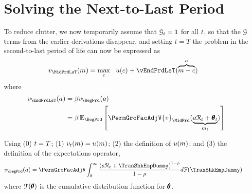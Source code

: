 
\hypertarget{solving-the-next-to-last-period}{}
\hypertarget{solving-the-next}{}
\section{Solving the Next-to-Last Period}\label{sec:solving-the-next}

To reduce clutter, we now temporarily assume that $\mathcal{G}_{t}=1$ for all $t$, so that the $\mathcal{G}$ terms from the earlier derivations disappear, and setting $t=T$ the problem in the second-to-last period of life can now be expressed as
\begin{equation}\begin{gathered}\begin{aligned}
  {\vFunc}_{\MidPrdLsT}(\mNrm)  & = \max_{\cNrm} ~~ \uFunc(\cNrm) +
                              \vEndPrdLsT(\overbrace{\mNrm-\cNrm}^{\aNrm})
                              \label{eq:vEndTm1}
\end{aligned}\end{gathered}\end{equation}
where 
\begin{equation*}\begin{gathered}\begin{aligned}
  {\vFunc}_{\EndPrdLsT}(\aNrm)  & = \DiscFac \vFunc_{\BegPrd}(\aNrm) 
\\                          & = \DiscFac \Ex_{\BegPrd} \left[\PermGroFacAdjV {\vFunc}_{\MidPrd}(\underbrace{\aNrm \RNrm_{\prdT} + \TranShkEmp_{\prdT}}_{{m}_{\prdT}})\right]
    \end{aligned}\end{gathered}\end{equation*}



Using (0) $t=T$; (1) $v_{t}({m})=u({m})$; (2) the definition of $u({m})$; and (3) the definition of the expectations operator,  %
\begin{equation}\begin{gathered}\begin{aligned}
      {\vFunc}_{\BegPrd}(\aNrm)   & = \PermGroFacAdjV\int_{0}^{\infty} \frac{\left(\aNrm \RNrm_{\prd}+ \TranShkEmpDummy\right)^{1-\CRRA}}{1-\CRRA}  d\FDist(\TranShkEmpDummy) \label{eq:NumDefInt}
    \end{aligned}\end{gathered}\end{equation}
where $\mathcal{F}(\pmb{\theta})$ is the cumulative distribution function for ${\pmb{\theta}}$.

